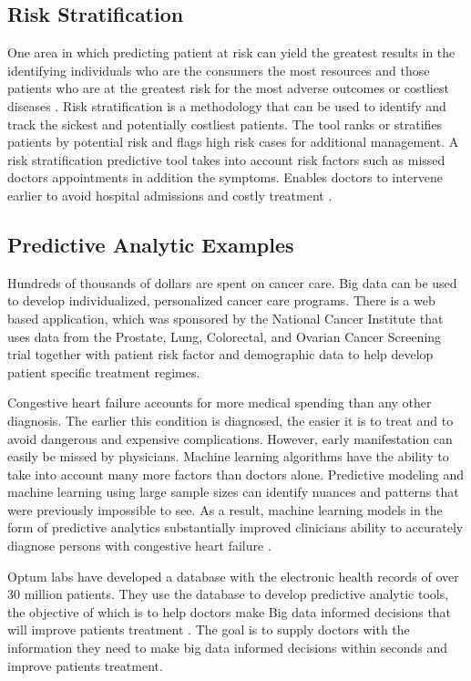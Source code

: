 \documentclass[sigconf]{acmart}
\begin{document}
{\subsection{Risk Stratification}
One area in which predicting patient at risk can yield the greatest results in the identifying individuals who are the consumers the most resources and those patients who are at the greatest risk for the most adverse outcomes or costliest diseases \cite{springer}. Risk stratification is a methodology that can be used to identify and track the sickest and potentially costliest patients. The tool ranks or stratifies patients by potential risk and flags high risk cases for additional management. A risk stratification predictive tool takes into account risk factors such as missed doctors appointments in addition the symptoms. Enables doctors to intervene earlier to avoid hospital admissions and costly treatment \cite{www-google-data}.

\subsection{ Predictive Analytic Examples}  
Hundreds of thousands of dollars are spent on cancer care. Big data can be used to develop individualized, personalized cancer care programs. There is a web based application, which was sponsored by the National Cancer Institute that uses data from the Prostate, Lung, Colorectal, and Ovarian Cancer Screening trial together with patient risk factor and demographic data to help develop patient specific treatment regimes. 

Congestive heart failure accounts for more medical spending than any other diagnosis. The earlier this condition is diagnosed, the easier it is to treat and to avoid dangerous and expensive complications.  However, early manifestation can easily be missed by physicians. Machine learning algorithms have the ability to take into account many more factors than doctors alone. Predictive modeling and machine learning using large sample sizes can identify nuances and patterns that were previously impossible to see.  As a result, machine learning models in the form of predictive analytics substantially improved clinicians ability to accurately diagnose persons with congestive heart failure \cite{www-google-datapine}. 

Optum labs have developed a database with the electronic health records of over 30 million patients. They use the database to develop predictive analytic tools, the objective of which is to help doctors make Big data informed decisions that will improve patients treatment \cite{www-google-McDonald}.  The goal is to supply doctors with the information they need to make big data informed decisions within seconds and improve patients treatment. 

}
\end{document}
